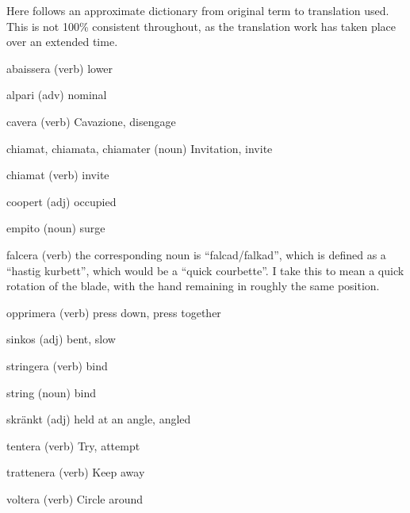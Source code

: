 \newpage
{}

Here follows an approximate dictionary from original term to translation used. This is not 100\% consistent throughout, as the translation work has taken place over an extended time.

\begin{description}
\item{abaissera} (verb) lower
\item{alpari} (adv) nominal
\item{cavera} (verb) Cavazione, disengage
\item{chiamat, chiamata, chiamater} (noun) Invitation, invite
\item{chiamat} (verb) invite
\item{coopert} (adj) occupied
\item{empito} (noun) surge
\item{falcera} (verb) the corresponding noun is ``falcad/falkad'', which is defined as a ``hastig kurbett'', which would be a ``quick courbette''. I take this to mean a quick rotation of the blade, with the hand remaining in roughly the same position.
\item{opprimera} (verb) press down, press together
\item{sinkos} (adj) bent, slow
\item{stringera} (verb) bind
\item{string} (noun) bind
\item{skränkt} (adj) held at an angle, angled
\item{tentera} (verb) Try, attempt
\item{trattenera} (verb) Keep away
\item{voltera} (verb) Circle around
\end{description}
